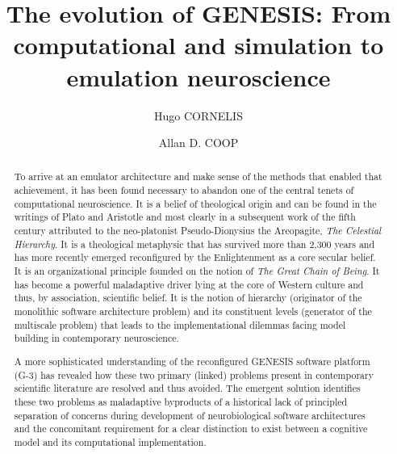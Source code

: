 \documentclass[11pt,3p,twocolumn]{JMN}
\begin{document}
\pagestyle{fancy}
\fancyhf{}
\rfoot{\thepage}

\begin{frontmatter}

\title{The evolution of GENESIS: From computational and simulation to emulation neuroscience}

\author[a,1]{Hugo CORNELIS} 
\author[b]{Allan D. COOP} 

\address[a]{\noindent Neurospaces Development, Daniëlstraat 27, 3500 Hasselt, BELGIUM}

\address[b]{Three Way Street, PO Box 140, Grenfell, 2801 NSW, AUSTRALIA\vspace{0.5cm}}

\address[1]{Corresponding author: {\bf hugo.cornelis@google.com}}

\begin{abstract}
To arrive at an emulator architecture and make sense of the methods that enabled that achievement, it has been found necessary to abandon one of the central tenets of computational neuroscience. It is a belief of theological origin and can be found in the writings of Plato and Aristotle and most clearly in a subsequent work of the fifth century attributed to the neo-platonist Pseudo-Dionysius the Areopagite, {\it{The Celestial Hierarchy}}. It is a theological metaphysic that has survived more than 2,300 years and has more recently emerged reconfigured by the Enlightenment as a core secular belief. It is an organizational principle founded on the notion of {\it{The Great Chain of Being}}. It has become a powerful maladaptive driver lying at the core of Western culture and thus, by association, scientific belief. It is the notion of hierarchy (originator of the monolithic software architecture problem) and its constituent levels (generator of the multiscale problem) that leads to the implementational dilemmas facing model building in contemporary neuroscience.

A more sophisticated understanding of the reconfigured GENESIS software platform (G-3) has revealed how these two primary (linked) problems present in contemporary scientific literature are resolved and thus avoided. The emergent solution identifies these two problems as maladaptive byproducts of a historical lack of principled separation of concerns during development of neurobiological software architectures and the concomitant requirement for a clear distinction to exist between a cognitive model and its computational implementation.


\end{abstract}
\end{frontmatter}
\end{document}
